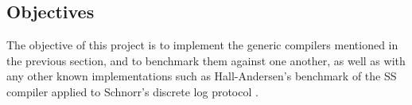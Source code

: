 
\subsection{Objectives}
The objective of this project is to implement the generic compilers mentioned in the previous section, and to benchmark them against one another, as well as with any other known implementations such as Hall-Andersen's benchmark of the SS compiler \cite{StackingSigmas} applied to Schnorr's discrete log protocol \cite{Schnorr}. 

